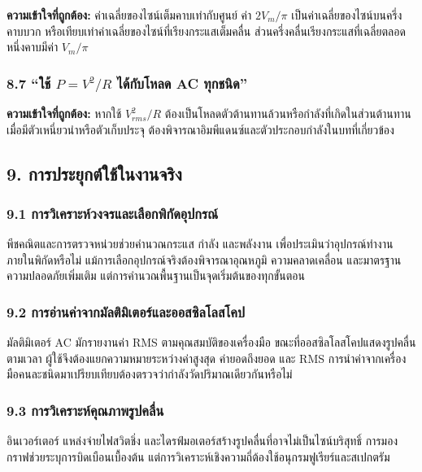 \textbf{ความเข้าใจที่ถูกต้อง:} ค่าเฉลี่ยของไซน์เต็มคาบเท่ากับศูนย์ ค่า $2V_m/\pi$ เป็นค่าเฉลี่ยของไซน์บนครึ่งคาบบวก หรือเทียบเท่าค่าเฉลี่ยของไซน์ที่เรียงกระแสเต็มคลื่น ส่วนครึ่งคลื่นเรียงกระแสที่เฉลี่ยตลอดหนึ่งคาบมีค่า $V_m/\pi$

\subsubsection{8.7 “ใช้ $P=V^2/R$ ได้กับโหลด AC ทุกชนิด”}

\textbf{ความเข้าใจที่ถูกต้อง:} หากใช้ $V_{rms}^2/R$ ต้องเป็นโหลดตัวต้านทานล้วนหรือกำลังที่เกิดในส่วนต้านทาน เมื่อมีตัวเหนี่ยวนำหรือตัวเก็บประจุ ต้องพิจารณาอิมพีแดนซ์และตัวประกอบกำลังในบทที่เกี่ยวข้อง

 

\subsection{9. การประยุกต์ใช้ในงานจริง}

\subsubsection{9.1 การวิเคราะห์วงจรและเลือกพิกัดอุปกรณ์}

พีชคณิตและการตรวจหน่วยช่วยคำนวณกระแส กำลัง และพลังงาน เพื่อประเมินว่าอุปกรณ์ทำงานภายในพิกัดหรือไม่ แม้การเลือกอุปกรณ์จริงต้องพิจารณาอุณหภูมิ ความคลาดเคลื่อน และมาตรฐานความปลอดภัยเพิ่มเติม แต่การคำนวณพื้นฐานเป็นจุดเริ่มต้นของทุกขั้นตอน

\subsubsection{9.2 การอ่านค่าจากมัลติมิเตอร์และออสซิลโลสโคป}

มัลติมิเตอร์ AC มักรายงานค่า RMS ตามคุณสมบัติของเครื่องมือ ขณะที่ออสซิลโลสโคปแสดงรูปคลื่นตามเวลา ผู้ใช้จึงต้องแยกความหมายระหว่างค่าสูงสุด ค่ายอดถึงยอด และ RMS การนำค่าจากเครื่องมือคนละชนิดมาเปรียบเทียบต้องตรวจว่ากำลังวัดปริมาณเดียวกันหรือไม่

\subsubsection{9.3 การวิเคราะห์คุณภาพรูปคลื่น}

อินเวอร์เตอร์ แหล่งจ่ายไฟสวิตชิ่ง และไดรฟ์มอเตอร์สร้างรูปคลื่นที่อาจไม่เป็นไซน์บริสุทธิ์ การมองกราฟช่วยระบุการบิดเบือนเบื้องต้น แต่การวิเคราะห์เชิงความถี่ต้องใช้อนุกรมฟูเรียร์และสเปกตรัม

